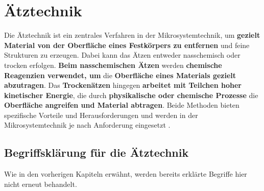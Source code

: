\documentclass{article} %
\begin{document}
\clearpage
\section{Ätztechnik}

Die Ätztechnik ist ein zentrales Verfahren in der Mikrosystemtechnik, um \textbf{gezielt Material von der Oberfläche eines Festkörpers zu entfernen} und feine Strukturen zu erzeugen. Dabei kann das Ätzen entweder nasschemisch oder trocken erfolgen. \textbf{Beim nasschemischen Ätzen} werden \textbf{chemische Reagenzien verwendet, um} die \textbf{Oberfläche eines Materials gezielt abzutragen}. Das \textbf{Trockenätzen} hingegen \textbf{arbeitet mit Teilchen hoher kinetischer Energie}, die durch \textbf{physikalische oder chemische Prozesse} die \textbf{Oberfläche angreifen und Material abtragen}. Beide Methoden bieten spezifische Vorteile und Herausforderungen und werden in der Mikrosystemtechnik je nach Anforderung eingesetzt \cite{schmid2024Aetzen}.





\vspace{1em}

\subsection{Begriffsklärung für die Ätztechnik}

Wie in den vorherigen Kapiteln erwähnt, werden bereits erklärte Begriffe hier nicht erneut behandelt.
\end{document}
